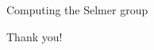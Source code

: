 \documentclass[10pt]{beamer}
\theoremstyle{definition}
\begin{document}
\begin{frame}[t]{Computing the Selmer group}
\end{frame}

\begin{frame}

\begin{center}

{\Huge Thank you!}

\end{center}

\end{frame}
\end{document}

